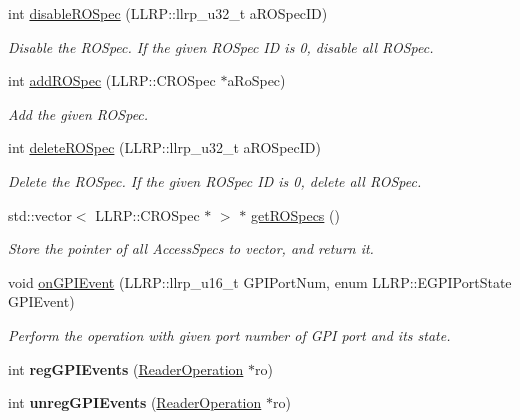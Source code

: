 \begin{DoxyCompactItemize}
int \hyperlink{class_e_l_f_i_n_1_1_r_o_admin_ad1ca9b5f64c9378eb483c69633744bca}{disable\-R\-O\-Spec} (L\-L\-R\-P\-::llrp\-\_\-u32\-\_\-t a\-R\-O\-Spec\-I\-D)
\begin{DoxyCompactList}\small\item\em Disable the R\-O\-Spec. If the given R\-O\-Spec I\-D is 0, disable all R\-O\-Spec. \end{DoxyCompactList}\item 
int \hyperlink{class_e_l_f_i_n_1_1_r_o_admin_acb11b2392981b891099afac7be76d2d0}{add\-R\-O\-Spec} (L\-L\-R\-P\-::\-C\-R\-O\-Spec $\ast$a\-Ro\-Spec)
\begin{DoxyCompactList}\small\item\em Add the given R\-O\-Spec. \end{DoxyCompactList}\item 
int \hyperlink{class_e_l_f_i_n_1_1_r_o_admin_aceaacbc11a48ec74e30c0e69b2c3de18}{delete\-R\-O\-Spec} (L\-L\-R\-P\-::llrp\-\_\-u32\-\_\-t a\-R\-O\-Spec\-I\-D)
\begin{DoxyCompactList}\small\item\em Delete the R\-O\-Spec. If the given R\-O\-Spec I\-D is 0, delete all R\-O\-Spec. \end{DoxyCompactList}\item 
std\-::vector$<$ L\-L\-R\-P\-::\-C\-R\-O\-Spec $\ast$ $>$ $\ast$ \hyperlink{class_e_l_f_i_n_1_1_r_o_admin_a7d85d578de11cde05b84f078faef08e3}{get\-R\-O\-Specs} ()
\begin{DoxyCompactList}\small\item\em Store the pointer of all Access\-Specs to vector, and return it. \end{DoxyCompactList}\item 
void \hyperlink{class_e_l_f_i_n_1_1_r_o_admin_a652f5d46a08d1889a4bd8b2db05a805d}{on\-G\-P\-I\-Event} (L\-L\-R\-P\-::llrp\-\_\-u16\-\_\-t G\-P\-I\-Port\-Num, enum L\-L\-R\-P\-::\-E\-G\-P\-I\-Port\-State G\-P\-I\-Event)
\begin{DoxyCompactList}\small\item\em Perform the operation with given port number of G\-P\-I port and its state. \end{DoxyCompactList}\item 
\hypertarget{class_e_l_f_i_n_1_1_r_o_admin_ac69a287d03feda8bcbfd356bbb926bdc}{int {\bfseries reg\-G\-P\-I\-Events} (\hyperlink{class_e_l_f_i_n_1_1_reader_operation}{Reader\-Operation} $\ast$ro)}\label{class_e_l_f_i_n_1_1_r_o_admin_ac69a287d03feda8bcbfd356bbb926bdc}

\item 
\hypertarget{class_e_l_f_i_n_1_1_r_o_admin_a5ecfe45c2f982eab689e7e9e28ae889d}{int {\bfseries unreg\-G\-P\-I\-Events} (\hyperlink{class_e_l_f_i_n_1_1_reader_operation}{Reader\-Operation} $\ast$ro)}\label{class_e_l_f_i_n_1_1_r_o_admin_a5ecfe45c2f982eab689e7e9e28ae889d}

\end{DoxyCompactItemize}
